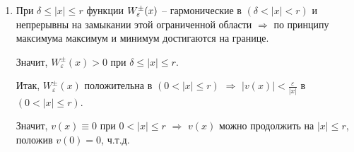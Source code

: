 \begin{enumerate}
\item{

При $\delta \le |x| \le r$  функции $W_\varepsilon^{\pm}(x)$
 -- гармонические в $(\delta < |x| < r)$ и непрерывны на замыкании 
этой ограниченной области $\Rightarrow$ по принципу максимума 
максимум и минимум достигаются на границе.

Значит, $W_\varepsilon^{\pm} (x) > 0$ при $\delta \le |x| \le r$.

Итак, $W_\varepsilon^\pm(x)$ положительна в $(0<|x| \le r)$
$\Rightarrow$  $|v(x)| < \frac{\varepsilon}{|x|}$ в $(0<|x|\le r)$.

Значит, $v(x) \equiv 0$ при $0<|x|\le r$ $\Rightarrow$ $v(x)$ можно продолжить на $|x|\le r$, положив $v(0)=0$, ч.т.д. 

}

\end{enumerate}
